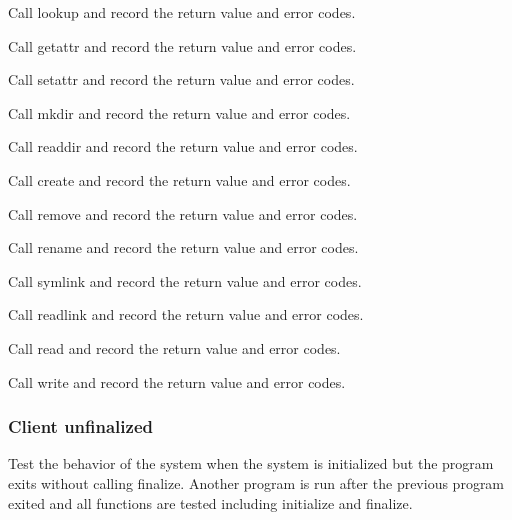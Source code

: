 \documentclass[12pt]{article} %
\begin{document}
\begin{list}{.}{}
\item Call lookup and record the return value and error codes.
\item Call getattr and record the return value and error codes.
\item Call setattr and record the return value and error codes.
\item Call mkdir and record the return value and error codes.
\item Call readdir and record the return value and error codes.
\item Call create and record the return value and error codes.
\item Call remove and record the return value and error codes.
\item Call rename and record the return value and error codes.
\item Call symlink and record the return value and error codes.
\item Call readlink and record the return value and error codes.
\item Call read and record the return value and error codes.
\item Call write and record the return value and error codes.
\end{list}

\subsubsection{Client unfinalized}
Test the behavior of the system when the system is initialized but the program exits without calling finalize.  Another program is run after the previous program exited and all functions are tested including initialize and finalize.
\end{document}
